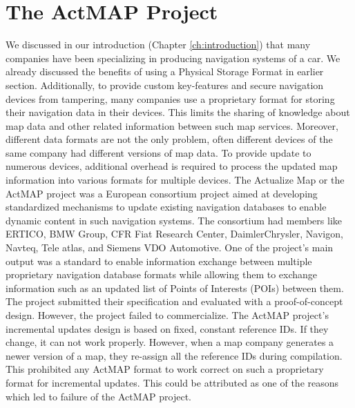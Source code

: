 \section{The ActMAP Project} \label{actmapprojectsection}
We discussed in our introduction (Chapter \ref{ch:introduction}) that many companies have been specializing in producing navigation systems of a car. We already discussed the benefits of using a Physical Storage Format in earlier section. Additionally, to provide custom key-features and secure navigation devices from tampering, many companies use a proprietary format for storing their navigation data in their devices. This limits the sharing of knowledge about map data and other related information between such map services. Moreover, different data formats are not the only problem, often different devices of the same company had different versions of map data. To provide update to numerous devices, additional overhead is required to process the updated map information into various formats for multiple devices. The Actualize Map or the ActMAP project \cite{flament2003actmap} was a European consortium project aimed at developing standardized mechanisms to update existing navigation databases to enable dynamic content in such navigation systems. The consortium had members like ERTICO, BMW Group, CFR Fiat Research Center, DaimlerChrysler, Navigon, Navteq, Tele atlas, and Siemens VDO Automotive. One of the project's main output was a standard to enable information exchange between multiple proprietary navigation database formats while allowing them to exchange information such as an updated list of Points of Interests (POIs) between them. The project submitted their specification \cite{flament2003actmap} and evaluated with a proof-of-concept design. However, the project failed to commercialize. The ActMAP project's incremental updates design is based on fixed, constant reference IDs. If they change, it can not work properly. However, when a map company generates a newer version of a map, they re-assign all the reference IDs during compilation. This prohibited any ActMAP format to work correct on such a proprietary format for incremental updates. This could be attributed as one of the reasons which led to failure of the ActMAP project.\\


